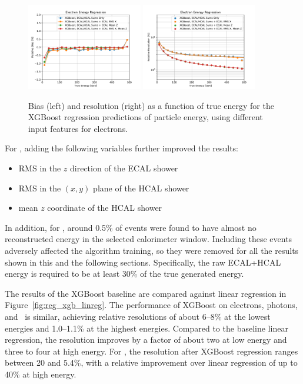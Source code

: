 \begin{figure}[htbp]
\centering
\includegraphics[width=0.45\textwidth]{Images/Calo/bias_vs_E_EleFixed_xgb_ecalmoms_zoom.pdf}
\includegraphics[width=0.45\textwidth]{Images/Calo/res_vs_E_EleFixed_xgb_ecalmoms_fits.pdf}
\caption{Bias (left) and resolution (right) as a function of true energy for the XGBoost regression predictions of particle energy, using different input features for electrons.\label{fig:reg_xgb_ecalmoms}}
\end{figure}

For \chpi, adding the following variables further improved the results:

\begin{itemize}
\item RMS in the $z$ direction of the ECAL shower
\item RMS in the $(x,y)$ plane of the HCAL shower
\item mean $z$ coordinate of the HCAL shower
\end{itemize}

In addition, for \chpi, around 0.5\% of events were found to have almost no reconstructed energy in the selected calorimeter window.  Including these events adversely affected the algorithm training, so they were removed for all the results shown in this and the following sections. Specifically, the raw ECAL+HCAL energy is required to be at least 30\% of the true generated energy.

The results of the XGBoost baseline are compared against linear regression in Figure~\ref{fig:reg_xgb_linreg}. The performance of XGBoost on electrons, photons, and \pizero\ is similar, achieving relative resolutions of about 6--8\% at the lowest energies and 1.0--1.1\% at the highest energies.  Compared to the baseline linear regression, the resolution improves by a factor of about two at low energy and three to four at high energy.  For \chpi, the resolution after XGBoost regression ranges between 20 and 5.4\%, with a relative improvement over linear regression of up to 40\% at high energy.

